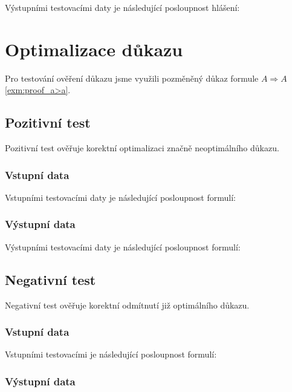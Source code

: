 \documentclass[thesis=B,czech,hidelinks]{thesis}[2012/06/26]
\begin{document}
Výstupními testovacími daty je následující posloupnost hlášení:



\section{Optimalizace důkazu}

Pro testování ověření důkazu jsme využili pozměněný důkaz formule $A \Rightarrow A$ \ref{exm:proof_a>a}.

\subsection{Pozitivní test}

Pozitivní test ověřuje korektní optimalizaci značně neoptimálního důkazu.

\subsubsection{Vstupní data}

Vstupními testovacími daty je následující posloupnost formulí:



\subsubsection{Výstupní data}

Výstupními testovacími daty je následující posloupnost formulí:



\subsection{Negativní test}

Negativní test ověřuje korektní odmítnutí již optimálního důkazu.

\subsubsection{Vstupní data}

Vstupními testovacími je následující posloupnost formulí:



\subsubsection{Výstupní data}
\end{document}
